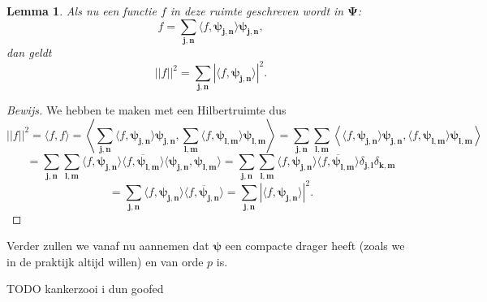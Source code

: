 \documentclass[11pt]{amsart}
\newtheorem*{lemma}{Lemma}
\begin{document}
\begin{lemma}
Als nu een functie $f$ in deze ruimte geschreven wordt in $\boldsymbol{\Psi}$:
\[
f = \sum_{\boldsymbol{j,n}} \langle f, \boldsymbol{\psi_{j,n}} \rangle \boldsymbol{\psi_{j,n}},
\]
dan geldt
\[
||f||^2 = \sum_{\boldsymbol{j,n}} | \langle f, \boldsymbol{\psi_{j,n}} \rangle |^2.
\]
\end{lemma}
\begin{proof}[Bewijs]
We hebben te maken met een Hilbertruimte dus
\[
||f||^2 = \langle f, f \rangle = \left\langle \sum_{\boldsymbol{j,n}} \langle f, \boldsymbol{\psi_{j,n}} \rangle \boldsymbol{\psi_{j,n}}, \sum_{\boldsymbol{l,m}} \langle f, \boldsymbol{\psi_{l,m}} \rangle \boldsymbol{\psi_{l,m}} \right\rangle = \sum_{\boldsymbol{j,n}} \sum_{\boldsymbol{l,m}} \left\langle \langle f, \boldsymbol{\psi_{j,n}} \rangle \boldsymbol{\psi_{j,n}}, \langle f, \boldsymbol{\psi_{l,m}} \rangle \boldsymbol{\psi_{l,m}} \right \rangle
\]
\[
 = \sum_{\boldsymbol{j,n}} \sum_{\boldsymbol{l,m}} \langle f, \boldsymbol{\psi_{j,n}} \rangle \overline{\langle f, \boldsymbol{\psi_{l,m}} \rangle}\langle \boldsymbol{\psi_{j,n}}, \boldsymbol{\psi_{l,m}} \rangle = \sum_{\boldsymbol{j,n}} \sum_{\boldsymbol{l,m}} \langle f, \boldsymbol{\psi_{j,n}} \rangle \overline{\langle f, \boldsymbol{\psi_{l,m}} \rangle} \delta_{\boldsymbol{j,l}} \delta_{\boldsymbol{k,m}} 
\]
\[ = \sum_{\boldsymbol{j,n}} \langle f, \boldsymbol{\psi_{j,n}} \rangle \overline{\langle f, \boldsymbol{\psi_{j,n}} \rangle} = \sum_{\boldsymbol{j,n}} |\langle f, \boldsymbol{\psi_{j,n}} \rangle |^2.
\]
\end{proof}

Verder zullen we vanaf nu aannemen dat $\boldsymbol\psi$ een compacte drager heeft (zoals we in de praktijk altijd willen) en van orde $p$ is.

TODO kankerzooi i dun goofed
\end{document}
